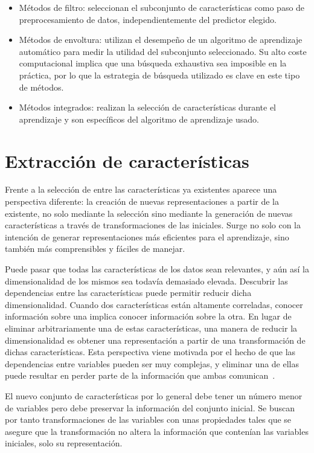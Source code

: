 \begin{itemize}

  \item Métodos de filtro: seleccionan el subconjunto de características como paso de preprocesamiento de datos, independientemente del predictor elegido.
  \item Métodos de envoltura: utilizan el desempeño de un algoritmo de aprendizaje automático para medir la utilidad del subconjunto seleccionado. Su alto coste computacional implica que una búsqueda exhaustiva sea imposible en la práctica, por lo que la estrategia de búsqueda utilizado es clave en este tipo de métodos.
  \item Métodos integrados: realizan la selección de características durante el aprendizaje y son específicos del algoritmo de aprendizaje usado.

\end{itemize}

\section{Extracción de características}

Frente a la selección de entre las características ya existentes aparece una perspectiva diferente: la creación de nuevas representaciones a partir de la existente, no solo mediante la selección sino mediante la generación de nuevas características a través de transformaciones de las iniciales. Surge no solo con la intención de generar representaciones más eficientes para el aprendizaje, sino también más comprensibles y fáciles de manejar.

Puede pasar que todas las características de los datos sean relevantes, y aún así la dimensionalidad de los mismos sea todavía demasiado elevada. Descubrir las dependencias entre las características puede permitir reducir dicha dimensionalidad. Cuando dos características están altamente correladas, conocer información sobre una implica conocer información sobre la otra. En lugar de eliminar arbitrariamente una de estas características, una manera de reducir la dimensionalidad es obtener una  representación a partir de una transformación de dichas características. Esta perspectiva viene motivada por el hecho de que las dependencias entre variables pueden ser muy complejas, y eliminar una de ellas puede resultar en perder parte de la información que ambas comunican~\cite{lee2007nonlinear}.

El nuevo conjunto de características por lo general debe tener un número menor de variables pero debe preservar la información del conjunto inicial. Se buscan por tanto transformaciones de las variables con unas propiedades tales que se asegure que la transformación no altera la información que contenían las variables iniciales, solo su representación.

